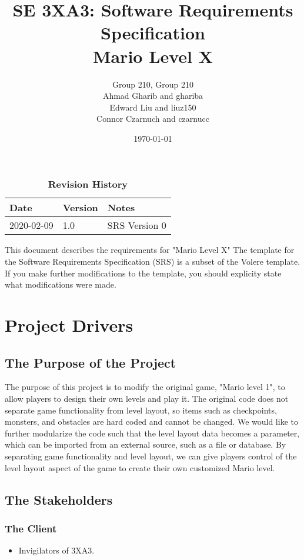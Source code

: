 \documentclass[12pt, titlepage]{article}
\title{SE 3XA3: Software Requirements Specification\\Mario Level X}
\author{Group 210, Group 210
		\\ Ahmad Gharib and ghariba
		\\ Edward Liu and liuz150
		\\ Connor Czarnuch and czarnucc
}
\date{\today}
\begin{document}
\maketitle

\tableofcontents
\listoftables
\listoffigures

\begin{table}[bp]
\caption{\bf Revision History}
\begin{tabularx}{\textwidth}{p{3cm}p{2cm}X}
\toprule {\bf Date} & {\bf Version} & {\bf Notes}\\
\midrule
2020-02-09 & 1.0 & SRS Version 0\\
\bottomrule
\end{tabularx}
\end{table}

\newpage


This document describes the requirements for "Mario Level X"  The template for the Software
Requirements Specification (SRS) is a subset of the Volere
template.  If you make further modifications
to the template, you should explicity state what modifications were made.

\section{Project Drivers}

\subsection{The Purpose of the Project}
The purpose of this project is to modify the original game, "Mario level 1", to allow players to design their own levels and play it. The original code does not separate game functionality from level layout, so items such as checkpoints, monsters, and obstacles are hard coded and cannot be changed. We would like to further modularize the code such that the level layout data becomes a parameter, which can be imported from an external source, such as a file or database. By separating game functionality and level layout, we can give players control of the level layout aspect of the game to create their own customized Mario level.

\subsection{The Stakeholders}

\subsubsection{The Client}
\begin{itemize}
    \item Invigilators of 3XA3.
\end{itemize}
\end{document}
